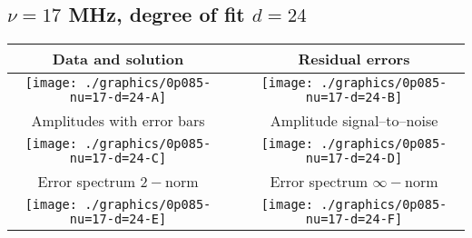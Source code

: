 

% 

\clearpage{}
\break{}

\subsection{$\nu = 17$ MHz, degree of fit $d = 24$}

\begin{table}[h]
    \begin{center}
        \begin{tabular}{ccc}
            Data and solution & \quad & Residual errors \\\hline
            \texttt{[image: ./graphics/0p085-nu=17-d=24-A]} &&
            \texttt{[image: ./graphics/0p085-nu=17-d=24-B]} \\[15pt]
            Amplitudes with error bars && Amplitude signal--to--noise \\\hline
            \texttt{[image: ./graphics/0p085-nu=17-d=24-C]} &&
            \texttt{[image: ./graphics/0p085-nu=17-d=24-D]} \\[15pt]
            Error spectrum $2-$norm && Error spectrum $\infty-$norm \\\hline
            \texttt{[image: ./graphics/0p085-nu=17-d=24-E]} &&
            \texttt{[image: ./graphics/0p085-nu=17-d=24-F]} \\[15pt]
        \end{tabular}
    \end{center}
\label{fig:elev=85, nu=17}
\end{table}



\endinput
